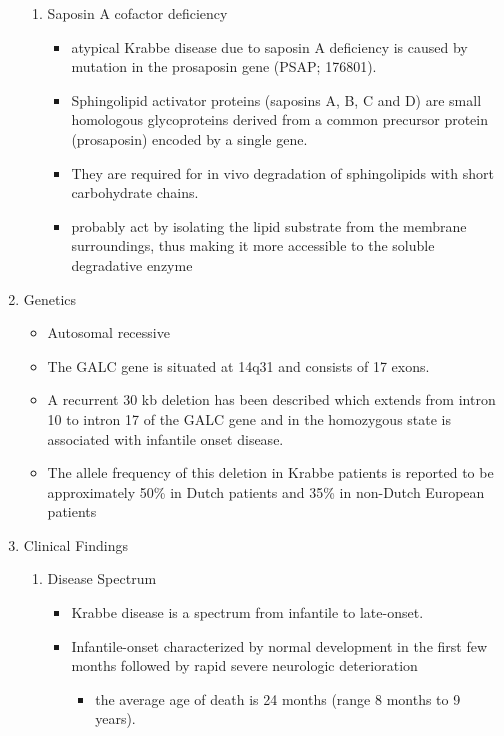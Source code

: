 \documentclass{scrartcl}
\begin{document}
\begin{enumerate}
\begin{enumerate}
\item Saposin A cofactor deficiency
\label{sec:orgfbc3b18}

\begin{itemize}
\item atypical Krabbe disease due to saposin A deficiency is caused by mutation in the prosaposin gene (PSAP; 176801).
\item Sphingolipid activator proteins (saposins A, B, C and D) are small
homologous glycoproteins derived from a common precursor protein
(prosaposin) encoded by a single gene.
\item They are required for in vivo degradation of sphingolipids with short carbohydrate chains.
\item probably act by isolating the lipid substrate from the membrane
surroundings, thus making it more accessible to the soluble
degradative enzyme
\end{itemize}
\end{enumerate}

\item Genetics
\label{sec:org9160c2a}
\begin{itemize}
\item Autosomal recessive
\item The GALC gene is situated at 14q31 and consists of 17 exons.
\item A recurrent 30 kb deletion has been described which extends from
intron 10 to intron 17 of the GALC gene and in the homozygous state
is associated with infantile onset disease.
\item The allele frequency of this deletion in Krabbe patients is reported
to be approximately 50\% in Dutch patients and 35\% in non-Dutch
European patients
\end{itemize}

\item Clinical Findings
\label{sec:org0fdd21f}
\begin{enumerate}
\item Disease Spectrum
\label{sec:org801af68}
\begin{itemize}
\item Krabbe disease is a spectrum from infantile to late-onset.

\item Infantile-onset characterized by normal development in the first few
months followed by rapid severe neurologic deterioration
\begin{itemize}
\item the average age of death is 24 months (range 8 months to 9 years).
\end{itemize}


\end{itemize}
\end{enumerate}
\end{enumerate}
\end{document}
